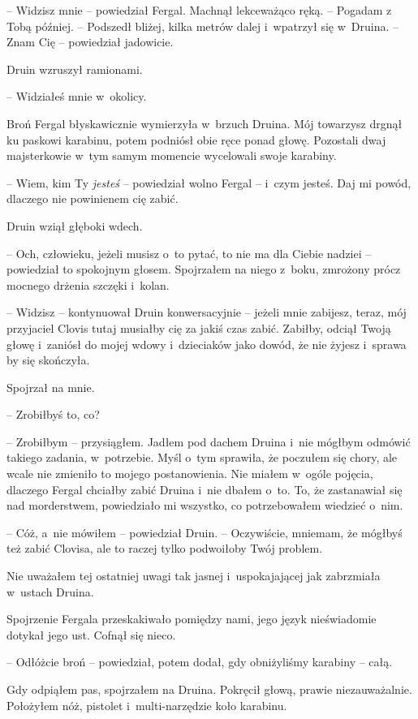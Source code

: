 \documentclass[oneside,polish,11pt,sfheadings]{mwbk}
\begin{document}
-- Widzisz mnie -- powiedział Fergal. Machnął lekceważąco ręką. -- Pogadam
z Tobą później. -- Podszedł bliżej, kilka metrów dalej i~wpatrzył się w~Druina. -- Znam Cię -- powiedział jadowicie.

Druin wzruszył ramionami. 

-- Widziałeś mnie w~okolicy.

Broń Fergal błyskawicznie wymierzyła w~brzuch Druina. Mój towarzysz
drgnął ku paskowi karabinu, potem podniósł obie ręce ponad głowę.
Pozostali dwaj majsterkowie w~tym samym momencie wycelowali swoje
karabiny.

-- Wiem, kim Ty \textit{jesteś} -- powiedział wolno Fergal -- i~czym jesteś.
Daj mi powód, dlaczego nie powinienem cię zabić.

Druin wziął głęboki wdech. 

-- Och, człowieku, jeżeli musisz o~to pytać,
to nie ma dla Ciebie nadziei -- powiedział to spokojnym głosem.
Spojrzałem na niego z~boku, zmrożony prócz mocnego drżenia szczęki i~kolan. 

-- Widzisz -- kontynuował Druin konwersacyjnie -- jeżeli mnie
zabijesz, teraz, mój przyjaciel Clovis tutaj musiałby cię za jakiś czas
zabić. Zabiłby, odciął Twoją głowę i~zaniósł do mojej wdowy i~dzieciaków
jako dowód, że nie żyjesz i~sprawa by się skończyła.

Spojrzał na mnie. 

-- Zrobiłbyś to, co?

-- Zrobiłbym -- przysiągłem. Jadłem pod dachem Druina i~nie mógłbym
odmówić takiego zadania, w~potrzebie. Myśl o~tym sprawiła, że poczułem
się chory, ale wcale nie zmieniło to mojego postanowienia. Nie miałem w~ogóle pojęcia, dlaczego Fergal chciałby zabić Druina i~nie dbałem o~to.
To, że zastanawiał się nad morderstwem, powiedziało mi wszystko, co
potrzebowałem wiedzieć o~nim.

-- Cóż, a~nie mówiłem -- powiedział Druin. -- Oczywiście, mniemam, że
mógłbyś też zabić Clovisa, ale to raczej tylko podwoiłoby Twój problem.

Nie uważałem tej ostatniej uwagi tak jasnej i~uspokajającej jak
zabrzmiała w~ustach Druina.

Spojrzenie Fergala przeskakiwało pomiędzy nami, jego język nieświadomie
dotykał jego ust. Cofnął się nieco.

-- Odłóżcie broń -- powiedział, potem dodał, gdy obniżyliśmy karabiny -- całą.

Gdy odpiąłem pas, spojrzałem na Druina. Pokręcił głową, prawie
niezauważalnie. Położyłem nóż, pistolet i~multi-narzędzie koło karabinu.
\end{document}
